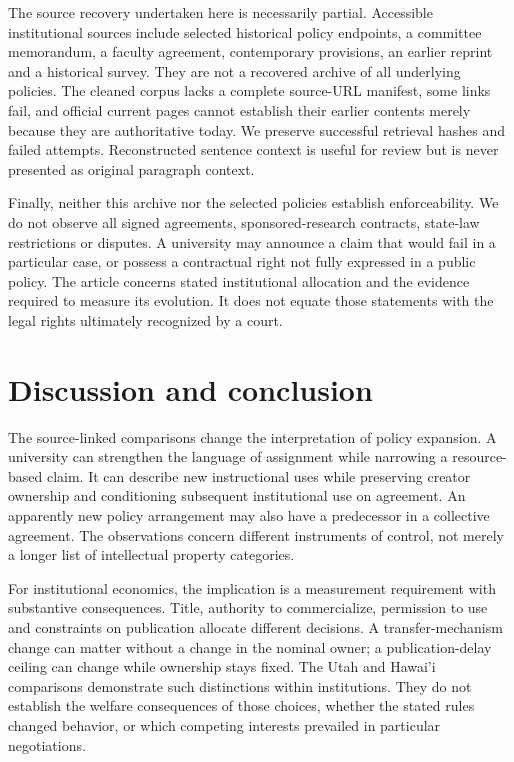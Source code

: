 \documentclass[12pt]{article}
\begin{document}
The source recovery undertaken here is necessarily partial. Accessible institutional sources include selected historical policy endpoints, a committee memorandum, a faculty agreement, contemporary provisions, an earlier reprint and a historical survey. They are not a recovered archive of all underlying policies. The cleaned corpus lacks a complete source-URL manifest, some links fail, and official current pages cannot establish their earlier contents merely because they are authoritative today. We preserve successful retrieval hashes and failed attempts. Reconstructed sentence context is useful for review but is never presented as original paragraph context.

Finally, neither this archive nor the selected policies establish enforceability. We do not observe all signed agreements, sponsored-research contracts, state-law restrictions or disputes. A university may announce a claim that would fail in a particular case, or possess a contractual right not fully expressed in a public policy. The article concerns stated institutional allocation and the evidence required to measure its evolution. It does not equate those statements with the legal rights ultimately recognized by a court.

\section{Discussion and conclusion}
The source-linked comparisons change the interpretation of policy expansion. A university can strengthen the language of assignment while narrowing a resource-based claim. It can describe new instructional uses while preserving creator ownership and conditioning subsequent institutional use on agreement. An apparently new policy arrangement may also have a predecessor in a collective agreement. The observations concern different instruments of control, not merely a longer list of intellectual property categories.

For institutional economics, the implication is a measurement requirement with substantive consequences. Title, authority to commercialize, permission to use and constraints on publication allocate different decisions. A transfer-mechanism change can matter without a change in the nominal owner; a publication-delay ceiling can change while ownership stays fixed. The Utah and Hawai'i comparisons demonstrate such distinctions within institutions. They do not establish the welfare consequences of those choices, whether the stated rules changed behavior, or which competing interests prevailed in particular negotiations.
\end{document}
